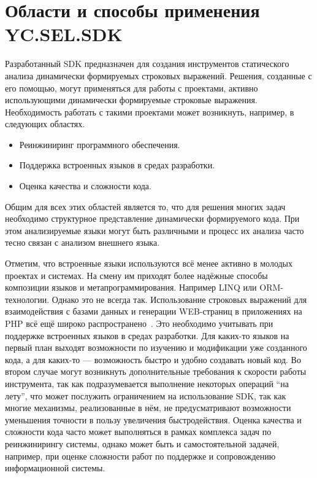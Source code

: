 \section{Области и способы применения YC.SEL.SDK}

Разработанный SDK предназначен для создания инструментов статического анализа динамически формируемых строковых выражений. Решения, созданные с его помощью, могут применяться для работы с проектами, активно использующими динамически формируемые строковые выражения. Необходимость работать с такими проектами может возникнуть, например, в следующих областях.

\begin{itemize}
    \item Реинжиниринг программного обеспечения.
    \item Поддержка встроенных языков в средах разработки.
    \item Оценка качества и сложности кода.
\end{itemize}

Общим для всех этих областей является то, что для решения многих задач необходимо структурное представление динамически формируемого кода. При этом анализируемые языки могут быть различными и процесс их анализа часто тесно связан с анализом внешнего языка.

Отметим, что встроенные языки используются всё менее активно в молодых проектах и системах. На смену им приходят более надёжные способы композиции языков и метапрограммирования. Например LINQ или ORM-технологии. Однако это не всегда так. Использование строковых выражений для взаимодействия с базами данных и генерации WEB-страниц в приложениях на PHP всё ещё широко распространено~\cite{DSQLInActiveUse}. Это необходимо учитывать при поддержке встроенных языков в средах разработки. Для каких-то языков на первый план выходят возможности по изучению и модификации уже созданного кода, а для каких-то --- возможность быстро и удобно создавать новый код. Во втором случае могут возникнуть дополнительные требования к скорости работы инструмента, так как подразумевается выполнение некоторых операций ``на лету'', что может послужить ограничением на использование SDK, так как многие механизмы, реализованные в нём, не предусматривают возможности уменьшения точности в пользу увеличения быстродействия. Оценка качества и сложности  кода часто может выполняться в рамках комплекса задач по реинжинирингу системы, однако может быть и самостоятельной задачей, например, при оценке сложности работ по поддержке и сопровождению информационной системы.


